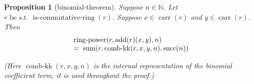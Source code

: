 \documentclass[11pt]{article}
\theoremstyle{plain}
\newtheorem{proposition}{Proposition}
\begin{document}
\begin{proposition}[binomial-theorem]
Suppose $n \in \mathbb{N}$. Let $r \text{ be s.t. } \operatorname{is\text{-}commutative\text{-}ring}(r)$. Suppose $x \in \operatorname{carr}(r)$ and $y \in \operatorname{carr}(r)$. Then
\begin{equation*}
\begin{array}{@{}l@{}} \operatorname{ring\text{-}power}(r, \operatorname{add}(r)(x, y), n) \\ =\; \operatorname{sum}(r, \operatorname{comb\text{-}kk}(r, x, y, n), \operatorname{succ}(n)) \end{array}
\end{equation*}


\noindent\emph{(Here $\operatorname{comb\text{-}kk}(r, x, y, n)$ is the internal representation of the binomial coefficient term; it is used throughout the proof.)}

\end{proposition}
\end{document}
